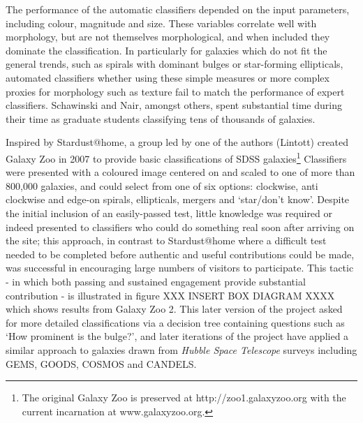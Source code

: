 \documentclass{ar2e}
\begin{document}
\begin{itemize}
The performance of the automatic classifiers depended on the input parameters, including colour, magnitude and size. These variables correlate well with morphology, but are not themselves morphological, and when included they dominate the classification. In particularly for galaxies which do not fit the general trends, such as spirals with dominant bulges or star-forming ellipticals, automated classifiers whether using these simple measures or more complex proxies for morphology such as texture fail to match the performance of expert classifiers. Schawinski and Nair, amongst others, spent substantial time during their time as graduate students classifying tens of thousands of galaxies. 

Inspired by Stardust@home, a group led by one of the authors (Lintott) created Galaxy Zoo in 2007 to provide basic classifications of SDSS galaxies\footnote{The original Galaxy Zoo is preserved at http://zoo1.galaxyzoo.org with the current incarnation at www.galaxyzoo.org.} Classifiers were presented with a coloured image centered on and scaled to one of more than 800,000 galaxies, and could select from one of six options: clockwise, anti clockwise and edge-on spirals, ellipticals, mergers and `star/don't know'. Despite the initial inclusion of an easily-passed test, little knowledge was required or indeed presented to classifiers who could do something real soon after arriving on the site; this approach, in contrast to Stardust@home where a difficult test needed to be completed before authentic and useful contributions could be made, was successful in encouraging large numbers of visitors to participate. This tactic - in which both passing and sustained engagement provide substantial contribution - is illustrated in figure XXX INSERT BOX DIAGRAM XXXX which shows results from Galaxy Zoo 2. This later version of the project asked for more detailed classifications via a decision tree containing questions such as `How prominent is the bulge?', and later iterations of the project have applied a similar approach to galaxies drawn from \emph{Hubble Space Telescope} surveys including \textsc{GEMS, GOODS, COSMOS} and \textsc{CANDELS}. 


\end{itemize}
\end{document}
